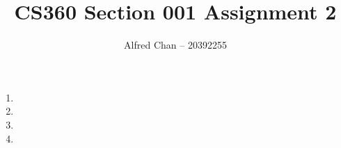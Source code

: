 \documentclass[12pt]{article}
\title{CS360 Section 001 Assignment 2}
\author{Alfred Chan -- 20392255}
\begin{document}
\maketitle
\clearpage

\begin{enumerate}
\item
\item
\item
\item
\end{enumerate}
\end{document}
